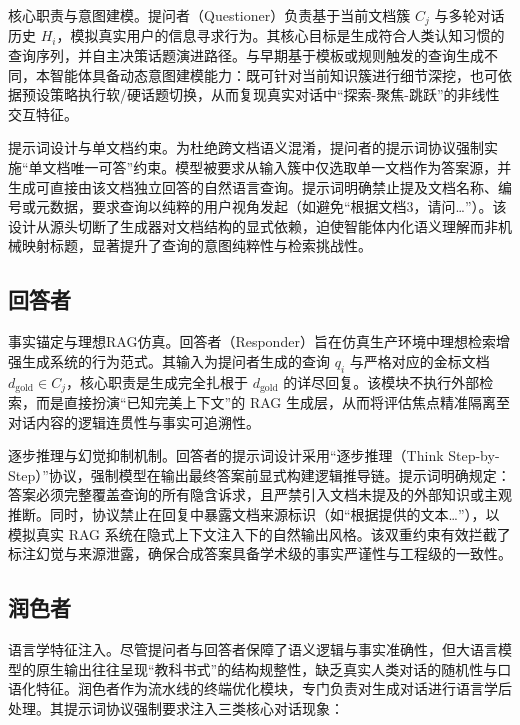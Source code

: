 核心职责与意图建模。提问者（Questioner）负责基于当前文档簇 $C_j$ 与多轮对话历史 $H_i$，模拟真实用户的信息寻求行为。其核心目标是生成符合人类认知习惯的查询序列，并自主决策话题演进路径。与早期基于模板或规则触发的查询生成不同，本智能体具备动态意图建模能力：既可针对当前知识簇进行细节深挖，也可依据预设策略执行软/硬话题切换，从而复现真实对话中“探索-聚焦-跳跃”的非线性交互特征。



提示词设计与单文档约束。为杜绝跨文档语义混淆，提问者的提示词协议强制实施“单文档唯一可答”约束。模型被要求从输入簇中仅选取单一文档作为答案源，并生成可直接由该文档独立回答的自然语言查询。提示词明确禁止提及文档名称、编号或元数据，要求查询以纯粹的用户视角发起（如避免“根据文档3，请问…”）。该设计从源头切断了生成器对文档结构的显式依赖，迫使智能体内化语义理解而非机械映射标题，显著提升了查询的意图纯粹性与检索挑战性。



\subsection{回答者}



事实锚定与理想RAG仿真。回答者（Responder）旨在仿真生产环境中理想检索增强生成系统的行为范式。其输入为提问者生成的查询 $q_i$ 与严格对应的金标文档 $d_{\text{gold}} \in C_j$，核心职责是生成完全扎根于 $d_{\text{gold}}$ 的详尽回复。该模块不执行外部检索，而是直接扮演“已知完美上下文”的 RAG 生成层，从而将评估焦点精准隔离至对话内容的逻辑连贯性与事实可追溯性。



逐步推理与幻觉抑制机制。回答者的提示词设计采用“逐步推理（Think Step-by-Step）”协议，强制模型在输出最终答案前显式构建逻辑推导链。提示词明确规定：答案必须完整覆盖查询的所有隐含诉求，且严禁引入文档未提及的外部知识或主观推断。同时，协议禁止在回复中暴露文档来源标识（如“根据提供的文本…”），以模拟真实 RAG 系统在隐式上下文注入下的自然输出风格。该双重约束有效拦截了标注幻觉与来源泄露，确保合成答案具备学术级的事实严谨性与工程级的一致性。



\subsection{润色者}



语言学特征注入。尽管提问者与回答者保障了语义逻辑与事实准确性，但大语言模型的原生输出往往呈现“教科书式”的结构规整性，缺乏真实人类对话的随机性与口语化特征。润色者作为流水线的终端优化模块，专门负责对生成对话进行语言学后处理。其提示词协议强制要求注入三类核心对话现象：


